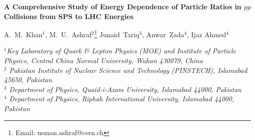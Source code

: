\documentclass{article}
\begin{document}

\begin{center}
{\Large \bf A Comprehensive Study of Energy Dependence of Particle Ratios in $pp$ Collisions from SPS to LHC Energies }

\vskip1.0cm

A.~M.~Khan$^{1}$,
M.~U.~Ashraf$^{2}${\footnote{Email: usman.ashraf@cern.ch}}
Junaid~Tariq$^{3}$,
Anwar~Zada$^{4}$, 
Ijaz Ahmed$^{4}$%

{\small\it 
$^1$Key Laboratory of Quark \& Lepton Physics (MOE) and Institute of Particle Physics,
Central China Normal University, Wuhan 430079, China\\
$^2$ Pakistan Institute of Nuclear Science and Technology (PINSTECH), Islamabad 45650, Pakistan\\
$^3$ Department of Physics, Quaid-i-Azam University, Islamabad 44000, Pakistan\\
$^4$ Department of Physics, Riphah International University, Islamabad 44000, Pakistan\\


}
\end{center}


\vskip1.0cm

\end{document}
